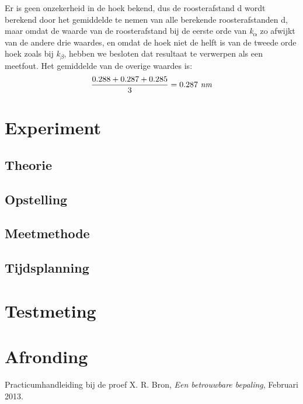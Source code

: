 \documentclass[a4paper]{article}
\begin{document}
 
 Er is geen onzekerheid in de hoek bekend, dus de roosterafstand d wordt berekend door het gemiddelde te nemen van alle berekende roosterafstanden d, maar omdat de waarde van de roosterafstand bij de eerste orde van \textit{k\textsubscript{$\alpha$}} zo afwijkt van de andere drie waardes, en omdat de hoek niet de helft is van de tweede orde hoek zoals bij \textit{k\textsubscript{$\beta$}}, hebben we besloten dat resultaat te verwerpen als een meetfout. Het gemiddelde van de overige waardes is: 
 $$\dfrac{0.288+0.287+0.285}{3}=\text{0.287 \textit{nm}}$$
 
 \section{Experiment} %
\label{sec:exp} %

\subsection{Theorie}
\subsection{Opstelling}
\subsection{Meetmethode}
\subsection{Tijdsplanning}
\section{Testmeting}
\label{sec:test}
\section{Afronding}
\begin{thebibliography}{99}
	 Practicumhandleiding bij de proef X.
	 R. Bron, \emph{Een betrouwbare bepaling}, Februari 2013.
\end{thebibliography}
\end{document}
